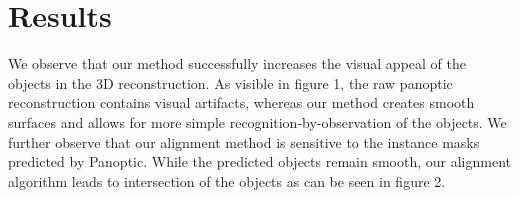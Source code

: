 \section{Results}
\label{sec:results}

We observe that our method successfully increases the visual appeal of the objects in the 3D reconstruction. As visible in figure 1, the raw panoptic reconstruction contains visual artifacts, whereas our method creates smooth surfaces and allows for more simple recognition-by-observation of the objects. We further observe that our alignment method is sensitive to the instance masks predicted by Panoptic. While the predicted objects remain smooth, our alignment algorithm leads to intersection of the objects as can be seen in figure 2.